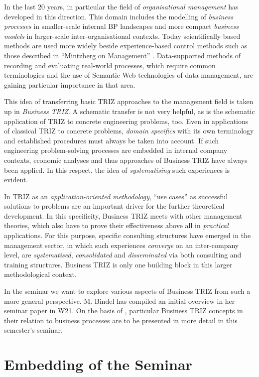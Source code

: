 \documentclass[11pt,a4paper]{article}
\begin{document}
In the last 20 years, in particular the field of \emph{organisational
management} has developed in this direction.  This domain includes the
modelling of \emph{business processes} in smaller-scale internal BP landscapes
and more compact \emph{business models} in larger-scale inter-organisational
contexts.  Today scientifically based methods are used more widely beside
experience-based control methods such as those described in \enquote{Mintzberg
  on Management} \cite{Mintzberg}. Data-supported methods of recording and
evaluating real-world processes, which require common terminologies and the
use of Semantic Web technologies of data management, are gaining particular
importance in that area.

This idea of transferring basic TRIZ approaches to the management field is
taken up in \emph{Business TRIZ}. A schematic transfer is not very helpful, as
is the schematic application of TRIZ to concrete engineering problems, too.
Even in applications of classical TRIZ to concrete problems, \emph{domain
  specifics} with its own terminology and established procedures must always
be taken into account. If such engineering problem-solving processes are
embedded in internal company contexts, economic analyses and thus approaches
of Business TRIZ have always been applied. In this respect, the idea of
\emph{systematising} such experiences is evident.

In TRIZ as an \emph{application-oriented methodology}, \enquote{use cases} as
successful solutions to problems are an important driver for the further
theoretical development. In this specificity, Business TRIZ meets with other
management theories, which also have to prove their effectiveness above all in
\emph{practical} applications. For this purpose, specific consulting
structures have emerged in the management sector, in which such experiences
\emph{converge} on an inter-company level, are \emph{systematised},
\emph{consolidated} and \emph{disseminated} via both consulting and training
structures. Business TRIZ is only one building block in this larger
methodological context.

In the seminar we want to explore various aspects of Business TRIZ from such a
more general perspective. M. Bindel \cite{Bindel} has compiled an initial
overview in her seminar paper in W21. On the basis of \cite{HSI}, particular
Business TRIZ concepts in their relation to business processes are to be
presented in more detail in this semester's seminar.

\section{Embedding of the Seminar}
\end{document}
